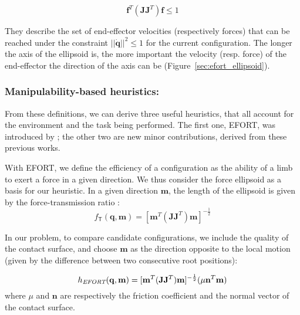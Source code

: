  \begin{equation} 
 \label{eq:for}
\mathbf{f}^T (\mathbf{J}\mathbf{J}^T) \mathbf{f} \leq 1
\end{equation}

They describe the set of end-effector velocities (respectively forces) that can
be reached under the constraint $||\dot{\mathbf{q}}||^2 \leq 1$ for the current configuration.
The longer the axis of the ellipsoid is, the more important the velocity (resp. force) of the end-effector the direction of the axis can be (Figure~\ref{sec:efort_ellipsoid}).
 
 

\subsubsection{Manipulability-based heuristics:}
From these definitions, we can derive three useful heuristics, that all account for the environment and the task being performed.
The first one, EFORT, was introduced by \cite{Tonneau2014}; the other two are new minor contributions, derived from these previous works.

With EFORT, we define the efficiency of a configuration as the ability of a limb to exert a force in a given direction.
We thus consider the force ellipsoid as a basis for our heuristic.
In a given direction $\mathbf{m}$, the length of the ellipsoid is given by the force-transmission ratio \citep{1087795}:
\begin{equation*}
f_\mathsf{T}(\mathbf{q}, \mathbf{m}) = [\mathbf{m}^{T}(\mathbf{J}\mathbf{J}	^{T})\mathbf{m}]^{-\frac{1}{2}}
\end{equation*}

In our problem, to compare candidate configurations, we include the quality of the contact surface, and choose $\mathbf{m}$ as the direction
opposite to the local motion (given by the difference between two consecutive root positions):

\begin{equation}
h_{\textrm{\it EFORT}}(\mathbf{q}, \mathbf{m}) = [\mathbf{m}^{T}(\mathbf{J}\mathbf{J}^T)\mathbf{m}]^{-\frac{1}{2}} ( \mu \mathbf{n}^T \mathbf{m})
\end{equation}
where $\mu$ and $\mathbf{n}$ are respectively the friction coefficient and the normal vector of the contact surface.


